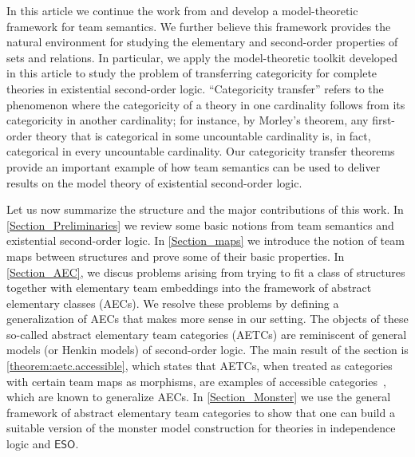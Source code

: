 \documentclass[a4paper]{amsart}
\theoremstyle{definition}
\theoremstyle{remark}
\newcommand\eso{\mathsf{ESO}}
\theoremstyle{definition}
\begin{document}
In this article we continue the work from \cite{puljujärvi2022compactness} and develop a model-theoretic framework for team semantics.  We further believe this framework provides the natural environment for studying the elementary and second-order properties of sets and relations. In particular, we apply the model-theoretic toolkit developed in this article to study the problem of transferring categoricity for complete theories in existential second-order logic. ``Categoricity transfer'' refers to the phenomenon where the categoricity of a theory in one cardinality follows from its categoricity in another cardinality; for instance, by Morley's theorem, any first-order theory that is categorical in some uncountable cardinality is, in fact, categorical in every uncountable cardinality. Our categoricity transfer theorems provide an important example of how team semantics can be used to deliver results on the model theory of existential second-order logic.

Let us now summarize the structure and the major contributions of this work. In \cref{Section_Preliminaries} we review some basic notions from team semantics and existential second-order logic. In \cref{Section_maps} we introduce the notion of team maps between structures and prove some of their basic properties. In \cref{Section_AEC}, we discus problems arising from trying to fit a class of structures together with elementary team embeddings into the framework of abstract elementary classes (AECs). We resolve these problems by defining a generalization of AECs that makes more sense in our setting. The objects of these so-called abstract elementary team categories (AETCs) are reminiscent of general models (or Henkin models) of second-order logic. The main result of the section is \cref{theorem:aetc.accessible}, which states that AETCs, when treated as categories with certain team maps as morphisms, are examples of accessible categories~\cite{adamek1994locally}, which are known to generalize AECs. In \cref{Section_Monster} we use the general framework of abstract elementary team categories to show that one can build a suitable version of the monster model construction for theories in independence logic and $\eso$. 
\end{document}

